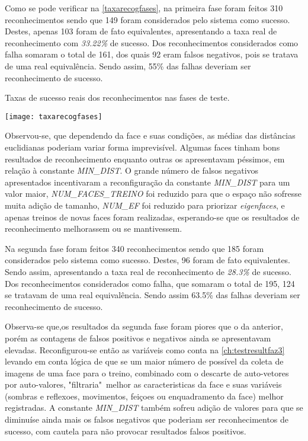 Como se pode verificar na \autoref{taxarecogfases}, na primeira fase foram feitos 310 reconhecimentos sendo que 149 foram considerados pelo sistema como sucesso. Destes, apenas 103 foram de fato equivalentes, apresentando a taxa real de reconhecimento com \textit{33.22\%} de sucesso. Dos reconhecimentos considerados como falha somaram o total de 161, dos quais 92 eram falsos negativos, pois se tratava de uma real equivalência. Sendo assim, 55\% das falhas deveriam ser reconhecimento de sucesso. 

\begin{table}[h]
	\centering
	\caption{Taxas de sucesso reais dos reconhecimentos nas fases de teste.}
	\texttt{[image: taxarecogfases]}
	\label{taxarecogfases}
\end{table}

Observou-se, que dependendo da face e suas condições, as médias das distâncias euclidianas poderiam variar forma imprevisível. Algumas faces tinham bons resultados de reconhecimento enquanto outras os apresentavam péssimos, em relação à constante \textit{MIN\_DIST}. O grande número de falsos negativos apresentados incentivaram a reconfiguração da constante \textit{MIN\_DIST} para um valor maior, \textit{NUM\_FACES\_TREINO} foi reduzido para que o espaço não sofresse muita adição de tamanho, \textit{NUM\_EF} foi reduzido para priorizar \textit{eigenfaces}, e apenas treinos de novas faces foram realizadas, esperando-se que os resultados de reconhecimento melhorassem ou se mantivessem.


Na segunda fase foram feitos 340 reconhecimentos sendo que 185 foram considerados pelo sistema como sucesso. Destes, 96 foram de fato equivalentes. Sendo assim, apresentando a taxa real de reconhecimento de \textit{28.3\%} de sucesso. Dos reconhecimentos considerados como falha, que somaram o total de 195, 124 se tratavam de uma real equivalência. Sendo assim 63.5\% das falhas deveriam ser reconhecimento de sucesso.

Observa-se que,os resultados da segunda fase foram piores que o da anterior, porém as contagens de falsos positivos e negativos ainda se apresentavam elevadas. Reconfigurou-se então as variáveis como conta na \autoref{ch:testresultfaz3} levando em conta lógica de que se um maior número de possível da coleta de imagens de uma face para o treino, combinado com o descarte de auto-vetores por auto-valores, "filtraria"\ melhor as caracteristicas da face e suas variáveis (sombras e reflexoes, movimentos, feiçoes ou enquadramento da face) melhor registradas. A constante \textit{MIN\_DIST} também sofreu adição de valores para que se diminuíse ainda mais os falsos negativos que poderiam ser reconhecimentos de sucesso, com cautela para não provocar resultados falsos positivos.


